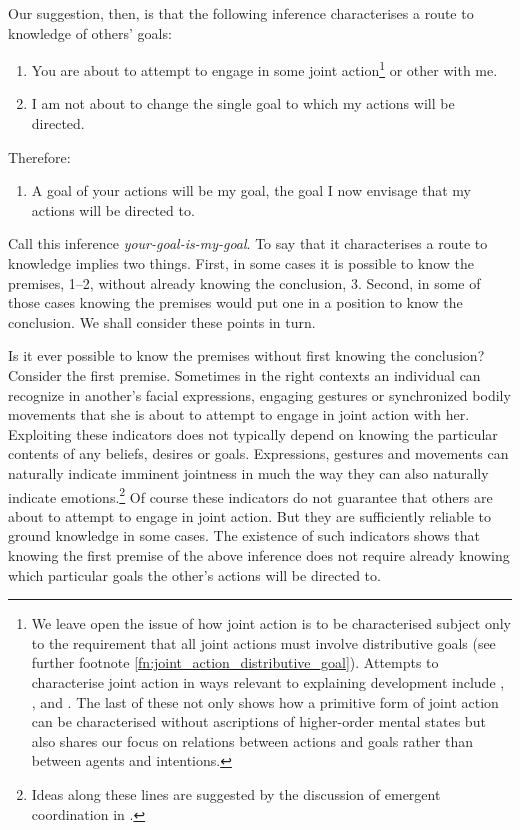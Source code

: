 \documentclass[12pt,\papersize]{extarticle}
\begin{document}
Our suggestion, then, is that the following inference characterises a route to knowledge of others’ goals:
%
\begin{enumerate}
\label{your_goal_is_my_goal}
\item You are 
about to attempt to 
engage in some joint action\footnote{
We leave open the issue of how joint action is to be characterised subject only to the 
requirement that all joint actions must involve distributive goals (see further footnote \vref{fn:joint_action_distributive_goal}).
Attempts to characterise joint action in ways relevant to explaining development include
	\citet{Tollefsen:2005vh},
	\citet{Carpenter:2009wq},
	\citet{pacherie_framing_2011} and
	\citet{Butterfill:2011fk}.
The last of these 
not only shows how a primitive form of joint action can be characterised without ascriptions of higher-order mental states
but also shares our focus on relations between actions and goals rather than between agents and intentions.
}
or other with me.

\item I am not about to change the single goal to which my actions will be directed.

\end{enumerate}
%
Therefore:
%
\begin{enumerate}[resume]
%
\item A goal of your actions will be my goal, the goal I now envisage that my actions will be directed to.
\end{enumerate}
%
Call this inference \emph{your-goal-is-my-goal}.  
To say that it characterises a route to knowledge implies two things.  
First, in some cases it is possible to know the premises, 1–2, without already knowing the conclusion, 3.  
Second, in some of those cases knowing the premises would put one in a position to know the conclusion.  
We shall consider these points in turn. %


Is it ever possible to know the premises without first knowing the conclusion?  
Consider the first premise.  
Sometimes 
in the right contexts
an individual can recognize in another's facial expressions, engaging gestures or synchronized bodily movements that she is about to attempt to engage in joint action with her.
Exploiting these indicators does not typically depend on knowing the particular contents of any beliefs, desires or goals.  
Expressions, gestures and movements can naturally indicate imminent jointness in much the way they can also naturally indicate emotions.\footnote{
Ideas along these lines are suggested by the discussion of {emergent coordination} in \citet{Knoblich:2010fk}.
}  
Of course these indicators do not guarantee that others are  about to attempt to engage in joint action.  
But they are sufficiently reliable to ground knowledge in some cases.  
The existence of such indicators shows that knowing the first  premise of the above inference does not require already knowing which particular goals the other's actions will be directed to.  
\end{document}

